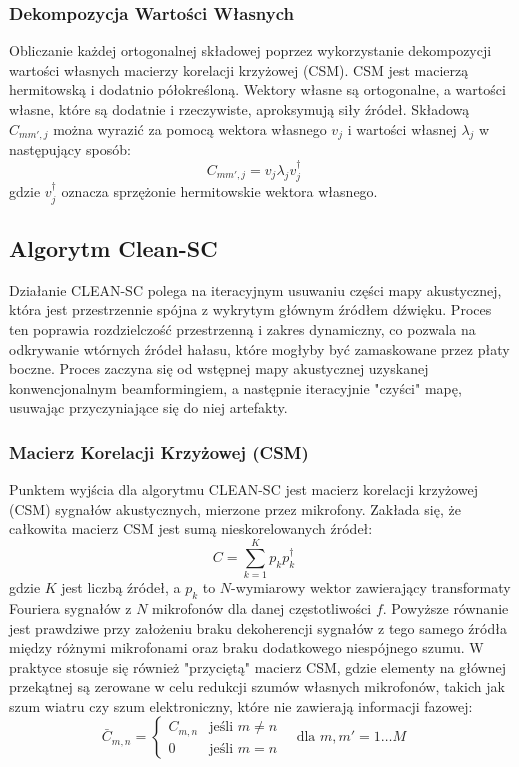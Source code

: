 \documentclass[12pt]{article}
\begin{document}
\subsubsection{Dekompozycja Wartości Własnych}
Obliczanie każdej ortogonalnej składowej poprzez wykorzystanie dekompozycji wartości własnych macierzy korelacji krzyżowej (CSM). CSM jest macierzą hermitowską i dodatnio półokreśloną. Wektory własne są ortogonalne, a wartości własne, które są dodatnie i rzeczywiste, aproksymują siły źródeł.
Składową $C_{mm',j}$ można wyrazić za pomocą wektora własnego $v_j$ i wartości własnej $\lambda_j$ w następujący sposób:
\begin{equation}
C_{mm',j} = v_j \lambda_j v_j^\dagger \quad \text{}
\end{equation}
gdzie $v_j^\dagger$ oznacza sprzężonie hermitowskie wektora własnego.


\subsection{Algorytm Clean-SC}
Działanie CLEAN-SC polega na iteracyjnym usuwaniu części mapy akustycznej, która jest przestrzennie spójna z wykrytym głównym źródłem dźwięku. Proces ten poprawia rozdzielczość przestrzenną i zakres dynamiczny, co pozwala na odkrywanie wtórnych źródeł hałasu, które mogłyby być zamaskowane przez płaty boczne. Proces zaczyna się od wstępnej mapy akustycznej uzyskanej konwencjonalnym beamformingiem, a następnie iteracyjnie "czyści" mapę, usuwając przyczyniające się do niej artefakty.

\subsubsection{Macierz Korelacji Krzyżowej (CSM)}
Punktem wyjścia dla algorytmu CLEAN-SC jest macierz korelacji krzyżowej (CSM) sygnałów akustycznych, mierzone przez mikrofony. Zakłada się, że całkowita macierz CSM jest sumą nieskorelowanych źródeł:
\begin{equation}
C = \sum_{k=1}^{K} p_k p_k^\dagger \quad \text{}
\end{equation}
gdzie $K$ jest liczbą źródeł, a $p_k$ to $N$-wymiarowy wektor zawierający transformaty Fouriera sygnałów z $N$ mikrofonów dla danej częstotliwości $f$. Powyższe równanie jest prawdziwe przy założeniu braku dekoherencji sygnałów z tego samego źródła między różnymi mikrofonami oraz braku dodatkowego niespójnego szumu. W praktyce stosuje się również "przyciętą" macierz CSM, gdzie elementy na głównej przekątnej są zerowane w celu redukcji szumów własnych mikrofonów, takich jak szum wiatru czy szum elektroniczny, które nie zawierają informacji fazowej:
\begin{equation}
\bar{C}_{m,n} = \begin{cases} C_{m,n} & \text{jeśli } m \neq n \\ 0 & \text{jeśli } m = n \end{cases} \quad \text{dla } m,m' = 1 \ldots M \quad \text{}
\end{equation}
\end{document}
